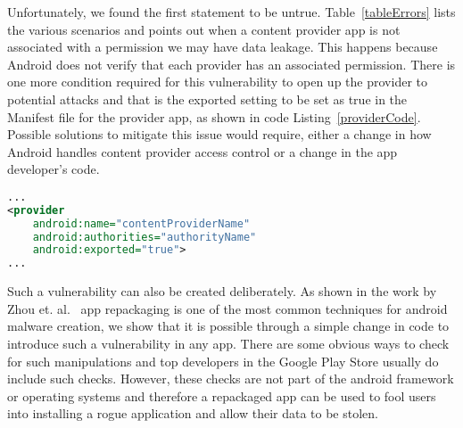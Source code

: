 Unfortunately, we found the first statement to be untrue. Table~\ref{tableErrors} lists the various scenarios and points out when a content provider app is not associated with a permission we may have data leakage. This happens because Android does not verify that each provider has an associated permission. There is one more condition required for this vulnerability to open up the provider to potential attacks and that is the exported setting to be set as true in the Manifest file for the provider app, as shown in code Listing~\ref{providerCode}. Possible solutions to mitigate this issue would require, either a change in how Android handles content provider access control or a change in the app developer's code.

\begin{lstlisting}[caption={Provider exported tag set as true},label={providerCode},language=XML]
...
<provider
	android:name="contentProviderName"
	android:authorities="authorityName"
	android:exported="true">
...
\end{lstlisting}

Such a vulnerability can also be created deliberately. As shown in the work by Zhou et. al.~\cite{Zhou2012MalwareGenomeProject} app repackaging is one of the most common techniques for android malware creation, we show that it is possible through a simple change in code to introduce such a vulnerability in any app. There are some obvious ways to check for such manipulations and top developers in the Google Play Store usually do include such checks. However, these checks are not part of the android framework or operating systems and therefore a repackaged app can be used to fool users into installing a rogue application and allow their data to be stolen.
